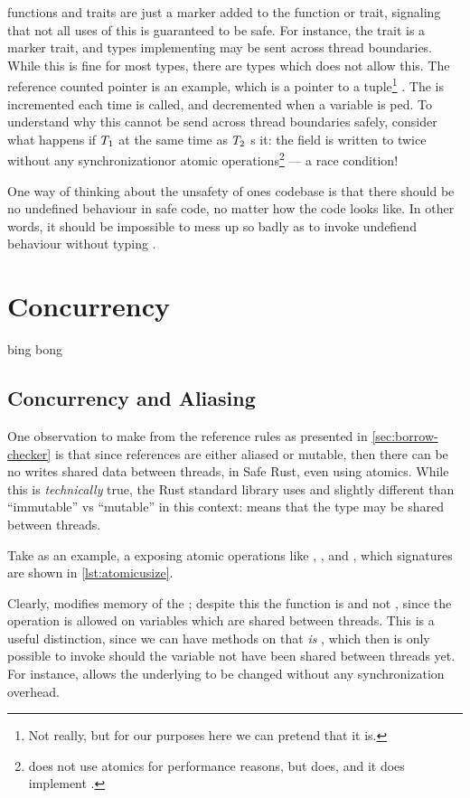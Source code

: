  functions and traits are just a marker added to the function or trait, signaling that
not all uses of this is guaranteed to be safe. For instance, the trait  is a marker
trait, and types implementing  may be sent across thread boundaries. While this is fine
for most types, there are types which does not allow this. The reference counted pointer
 is an example, which is a pointer to a tuple\footnote{Not really, but for our purposes
here we can pretend that it is.} . The  is incremented each time
 is called, and decremented when a variable is ped.  To understand why
this cannot be send across thread boundaries safely, consider what happens if $T\sb{1}$
 at the same time as $T\sb{2}$ s it: the  field is written to
twice without any synchronizationor atomic operations\footnote{ does not use atomics for
performance reasons, but  does, and it does implement .} --- a race condition!

One way of thinking about the unsafety of ones codebase is that there should be no undefined
behaviour in safe code, no matter how the code looks like. In other words, it should be impossible
to mess up so badly as to invoke undefiend behaviour without typing .



\section{Concurrency}

bing bong

\subsection{Concurrency and Aliasing}

One observation to make from the reference rules as presented in \cref{sec:borrow-checker} is that
since references are either aliased or mutable, then there can be no writes shared data between
threads, in Safe Rust, even using atomics. While this is \emph{technically} true, the Rust standard
library uses  and  slightly different than ``immutable'' vs ``mutable'' in
this context:  means that the type may be shared between threads.

Take  as an example, a  exposing atomic operations like ,
, and , which signatures are shown in \cref{lst:atomicusize}.

Clearly,  modifies memory of the ; despite this the function
is  and not , since the operation is allowed on variables which are
shared between threads.
This is a useful distinction, since we can have methods on  that \emph{is}
, which then is only possible to invoke should the variable not have been shared
between threads yet. For instance,  allows
the underlying  to be changed without any synchronization overhead.

